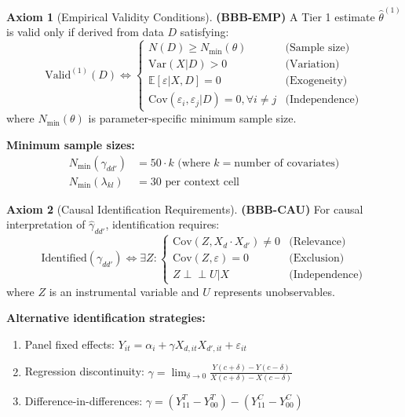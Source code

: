 \documentclass[11pt,a4paper]{article}
\theoremstyle{definition}
\newtheorem{axiom}{Axiom}[section]
\begin{document}
\begin{axiom}[Empirical Validity Conditions]
\label{ax:bbb-emp}
\textbf{(BBB-EMP)} A Tier 1 estimate $\hat{\theta}^{(1)}$ is valid only if 
derived from data $D$ satisfying:
\begin{equation}
\text{Valid}^{(1)}(D) \Leftrightarrow 
\begin{cases}
N(D) \geq N_{\min}(\theta) & \text{(Sample size)} \\
\text{Var}(X | D) > 0 & \text{(Variation)} \\
\mathbb{E}[\varepsilon | X, D] = 0 & \text{(Exogeneity)} \\
\text{Cov}(\varepsilon_i, \varepsilon_j | D) = 0, \forall i \neq j & \text{(Independence)}
\end{cases}
\end{equation}
where $N_{\min}(\theta)$ is parameter-specific minimum sample size.

\textbf{Minimum sample sizes:}
\begin{align}
N_{\min}(\gamma_{dd'}) &= 50 \cdot k \text{ (where } k = \text{number of covariates)} \\
N_{\min}(\lambda_{kl}) &= 30 \text{ per context cell}
\end{align}
\end{axiom}

\begin{axiom}[Causal Identification Requirements]
\label{ax:bbb-cau}
\textbf{(BBB-CAU)} For causal interpretation of $\hat{\gamma}_{dd'}$, identification 
requires:
\begin{equation}
\text{Identified}(\gamma_{dd'}) \Leftrightarrow \exists Z : 
\begin{cases}
\text{Cov}(Z, X_d \cdot X_{d'}) \neq 0 & \text{(Relevance)} \\
\text{Cov}(Z, \varepsilon) = 0 & \text{(Exclusion)} \\
Z \perp\!\!\!\perp U | X & \text{(Independence)}
\end{cases}
\end{equation}
where $Z$ is an instrumental variable and $U$ represents unobservables.

\textbf{Alternative identification strategies:}
\begin{enumerate}
    \item Panel fixed effects: $Y_{it} = \alpha_i + \gamma X_{d,it} X_{d',it} + \varepsilon_{it}$
    \item Regression discontinuity: $\gamma = \lim_{\delta \to 0} \frac{Y(c+\delta) - Y(c-\delta)}{X(c+\delta) - X(c-\delta)}$
    \item Difference-in-differences: $\gamma = (Y_{11}^T - Y_{00}^T) - (Y_{11}^C - Y_{00}^C)$
\end{enumerate}
\end{axiom}
\end{document}
